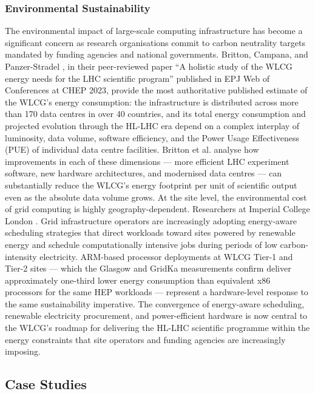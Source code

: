 \documentclass[12pt,a4paper]{report}
\begin{document}
      \subsubsection{Environmental Sustainability}
The environmental impact of large-scale computing infrastructure has become a significant concern as research organisations commit to carbon neutrality 
targets mandated by funding agencies and national governments. Britton, Campana, and Panzer-Stradel \parencite{britton2024energy}, in their peer-reviewed paper “A holistic
 study of the WLCG energy needs for the LHC scientific program” published in EPJ Web of Conferences at CHEP 2023, provide the most authoritative 
 published estimate of the WLCG’s energy consumption: the infrastructure is distributed across more than 170 data centres in over 40 countries, and 
 its total energy consumption and projected evolution through the HL-LHC era depend on a complex interplay of luminosity, data volume, software efficiency,
  and the Power Usage Effectiveness (PUE) of individual data centre facilities. Britton et al. analyse how improvements in each of these
   dimensions — more efficient LHC experiment software, new hardware architectures, and modernised data centres — can substantially reduce the 
   WLCG’s energy footprint per unit of scientific output even as the absolute data volume grows. At the site level, the environmental cost of grid 
   computing is highly geography-dependent. Researchers at Imperial College London \parencite{imperial2024environmental}. Grid infrastructure operators are increasingly
     adopting energy-aware scheduling strategies that direct workloads toward sites powered by renewable energy and schedule computationally intensive 
     jobs during periods of low carbon-intensity electricity. ARM-based processor deployments at WLCG Tier-1 and Tier-2 sites — which the Glasgow and
      GridKa measurements confirm deliver approximately one-third lower energy consumption than equivalent x86 processors for the same HEP 
      workloads — represent a hardware-level response to the same sustainability imperative. The convergence of energy-aware scheduling, 
      renewable electricity procurement, and power-efficient hardware is now central to the WLCG’s roadmap for delivering the HL-LHC scientific 
      programme within the energy constraints that site operators and funding agencies are increasingly imposing.

\subsection*{Case Studies}
\end{document}
